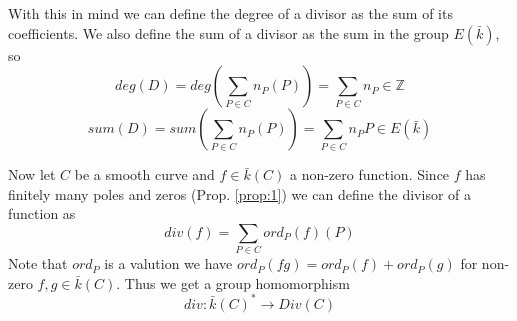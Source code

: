 \documentclass[a4paper,10pt]{amsart}
\begin{document}
With this in mind we can define the degree of a divisor as the sum of its 
coefficients. We also define the sum of a divisor as the sum in the group $E(\bar{k})$, so
$$ deg(D) = deg(\sum_{P\in C} n_P(P)) = \sum_{P\in C} n_P \in \mathbb{Z}$$
$$ sum(D) = sum(\sum_{P\in C} n_P(P)) = \sum_{P\in C} n_P P \in E(\bar{k})$$

Now let $C$ be a smooth curve and $f\in \bar{k}(C)$ a non-zero function. Since $f$
has finitely many poles and zeros (Prop. \ref{prop:1}) we can define the divisor of a
function as
$$ div(f) = \sum_{P\in C} ord_P(f)(P) $$
Note that $ord_P$ is a valution we have $ord_P(fg) = ord_P(f)+ord_P(g)$
for non-zero $f,g\in \bar{k}(C)$. Thus we get a group homomorphism
$$ div: \bar{k}(C)^* \rightarrow Div(C)$$
\end{document}
